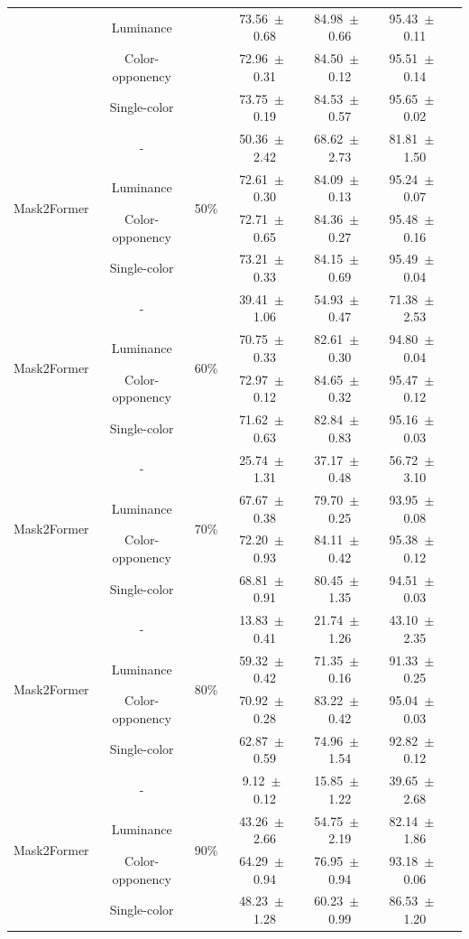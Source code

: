 \begin{table}[h]
\begin{tabular}{@{}lccc ccc@{}}
& Luminance & & 73.56~$\pm$~0.68 & 84.98~$\pm$~0.66 & 95.43~$\pm$~0.11 \\
& Color-opponency & & 72.96~$\pm$~0.31 & 84.50~$\pm$~0.12 & 95.51~$\pm$~0.14 \\
& Single-color & & 73.75~$\pm$~0.19 & 84.53~$\pm$~0.57 & 95.65~$\pm$~0.02 \\
\midrule
\multirow{4}{*}{Mask2Former} & - & \multirow{4}{*}{50\%} & 50.36~$\pm$~2.42 & 68.62~$\pm$~2.73 & 81.81~$\pm$~1.50 \\
& Luminance & & 72.61~$\pm$~0.30 & 84.09~$\pm$~0.13 & 95.24~$\pm$~0.07 \\
& Color-opponency & & 72.71~$\pm$~0.65 & 84.36~$\pm$~0.27 & 95.48~$\pm$~0.16 \\
& Single-color & & 73.21~$\pm$~0.33 & 84.15~$\pm$~0.69 & 95.49~$\pm$~0.04 \\
\midrule
\multirow{4}{*}{Mask2Former} & - & \multirow{4}{*}{60\%} & 39.41~$\pm$~1.06 & 54.93~$\pm$~0.47 & 71.38~$\pm$~2.53 \\
& Luminance & & 70.75~$\pm$~0.33 & 82.61~$\pm$~0.30 & 94.80~$\pm$~0.04 \\
& Color-opponency & & 72.97~$\pm$~0.12 & 84.65~$\pm$~0.32 & 95.47~$\pm$~0.12 \\
& Single-color & & 71.62~$\pm$~0.63 & 82.84~$\pm$~0.83 & 95.16~$\pm$~0.03 \\
\midrule
\multirow{4}{*}{Mask2Former} & - & \multirow{4}{*}{70\%} & 25.74~$\pm$~1.31 & 37.17~$\pm$~0.48 & 56.72~$\pm$~3.10 \\
& Luminance & & 67.67~$\pm$~0.38 & 79.70~$\pm$~0.25 & 93.95~$\pm$~0.08 \\
& Color-opponency & & 72.20~$\pm$~0.93 & 84.11~$\pm$~0.42 & 95.38~$\pm$~0.12 \\
& Single-color & & 68.81~$\pm$~0.91 & 80.45~$\pm$~1.35 & 94.51~$\pm$~0.03 \\
\midrule
\multirow{4}{*}{Mask2Former} & - & \multirow{4}{*}{80\%} & 13.83~$\pm$~0.41 & 21.74~$\pm$~1.26 & 43.10~$\pm$~2.35 \\
& Luminance & & 59.32~$\pm$~0.42 & 71.35~$\pm$~0.16 & 91.33~$\pm$~0.25 \\
& Color-opponency & & 70.92~$\pm$~0.28 & 83.22~$\pm$~0.42 & 95.04~$\pm$~0.03 \\
& Single-color & & 62.87~$\pm$~0.59 & 74.96~$\pm$~1.54 & 92.82~$\pm$~0.12 \\
\midrule
\multirow{4}{*}{Mask2Former} & - & \multirow{4}{*}{90\%} & 9.12~$\pm$~0.12 & 15.85~$\pm$~1.22 & 39.65~$\pm$~2.68 \\
& Luminance & & 43.26~$\pm$~2.66 & 54.75~$\pm$~2.19 & 82.14~$\pm$~1.86 \\
& Color-opponency & & 64.29~$\pm$~0.94 & 76.95~$\pm$~0.94 & 93.18~$\pm$~0.06 \\
& Single-color & & 48.23~$\pm$~1.28 & 60.23~$\pm$~0.99 & 86.53~$\pm$~1.20 \\
\midrule
\bottomrule
\end{tabular}
\label{tab:sparse_results_mask2former_cityscapes}
\end{table}
